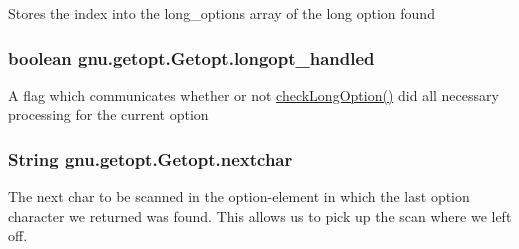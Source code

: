 \label{classgnu_1_1getopt_1_1_getopt_af0fee3aa183afb5b5326894bf0c25f64}
Stores the index into the long\_\-options array of the long option found \hypertarget{classgnu_1_1getopt_1_1_getopt_a156f519421b9d7707adee504e0bafac8}{
\subsubsection[{longopt\_\-handled}]{\setlength{\rightskip}{0pt plus 5cm}boolean {\bf gnu.getopt.Getopt.longopt\_\-handled}}}
\label{classgnu_1_1getopt_1_1_getopt_a156f519421b9d7707adee504e0bafac8}
A flag which communicates whether or not \hyperlink{classgnu_1_1getopt_1_1_getopt_ab748f7d3ed0781871d0b64f242e3674a}{checkLongOption()} did all necessary processing for the current option \hypertarget{classgnu_1_1getopt_1_1_getopt_a94938d6f4baca982818fc56f9e9ee959}{
\subsubsection[{nextchar}]{\setlength{\rightskip}{0pt plus 5cm}String {\bf gnu.getopt.Getopt.nextchar}}}
\label{classgnu_1_1getopt_1_1_getopt_a94938d6f4baca982818fc56f9e9ee959}
The next char to be scanned in the option-\/element in which the last option character we returned was found. This allows us to pick up the scan where we left off.


